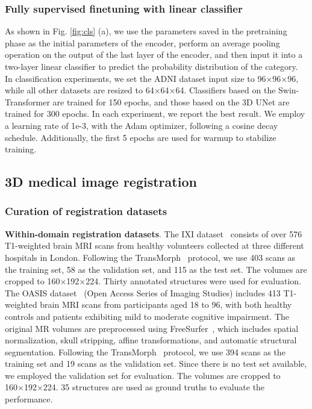 \subsubsection{Fully supervised finetuning with linear classifier}

As shown in Fig. \ref{fig:cls} (a), we use the parameters saved in the pretraining phase as the initial parameters of the encoder, perform an average pooling operation on the output of the last layer of the encoder, and then input it into a two-layer linear classifier to predict the probability distribution of the category.
In classification experiments, we set the ADNI dataset input size to 96×96×96, while all other datasets are resized to 64×64×64. Classifiers based on the Swin-Transformer are trained for 150 epochs, and those based on the 3D UNet are trained for 300 epochs. In each experiment, we report the best result.
We employ a learning rate of 1e-3, with the Adam optimizer, following a cosine decay schedule. Additionally, the first 5 epochs are used for warmup to stabilize training.

\subsection{3D medical image registration}
\subsubsection{Curation of registration datasets}

\textbf{Within-domain registration datasets}. The IXI dataset~\citep{Brain-Development_IXI_2019} consists of over 576 T1-weighted brain MRI scans from healthy volunteers collected at three different hospitals in London. Following the TransMorph~\citep{chen2022transmorph} protocol, we use 403 scans as the training set, 58 as the validation set, and 115 as the test set. The volumes are cropped to 160×192×224. Thirty annotated structures were used for evaluation.
The OASIS dataset~\citep{krentzel2023clem} (Open Access Series of Imaging Studies) includes 413 T1-weighted brain MRI scans from participants aged 18 to 96, with both healthy controls and patients exhibiting mild to moderate cognitive impairment. The original MR volumes are preprocessed using FreeSurfer~\cite{fischl2012freesurfer}, which includes spatial normalization, skull stripping, affine transformations, and automatic structural segmentation.
Following the TransMorph~\citep{chen2022transmorph} protocol, we use 394 scans as the training set and 19 scans as the validation set. Since there is no test set available, we employed the validation set for evaluation. The volumes are cropped to 160×192×224. 35 structures are used as ground truths to evaluate the performance.

